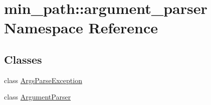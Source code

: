 \hypertarget{a00034}{}\section{min\+\_\+path\+:\+:argument\+\_\+parser Namespace Reference}
\label{a00034}
\subsection*{Classes}
\begin{DoxyCompactItemize}
\item 
class \hyperlink{a00001}{Args\+Parse\+Exception}
\item 
class \hyperlink{a00002}{Argument\+Parser}
\end{DoxyCompactItemize}

